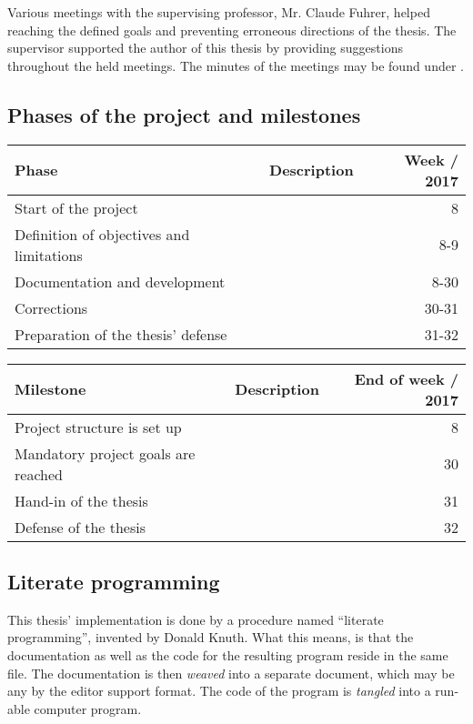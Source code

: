 \documentclass[10pt, openright, notitlepage]{scrreprt}
\begin{document}
Various meetings with the supervising professor, Mr. Claude Fuhrer, helped
reaching the defined goals and preventing erroneous directions of the thesis.
The supervisor supported the author of this thesis by providing suggestions
throughout the held meetings. The minutes of the meetings may be found under
\label{org5ea72a4}.

\subsection{Phases of the project and milestones}
\label{sec:org83e5910}


\begin{center}
\begin{tabular}{llr}
Phase & Description & Week / 2017\\
\hline
Start of the project &  & 8\\
Definition of objectives and limitations &  & 8-9\\
Documentation and development &  & 8-30\\
Corrections &  & 30-31\\
Preparation of the thesis' defense &  & 31-32\\
\end{tabular}
\end{center}

\begin{center}
\begin{tabular}{llr}
Milestone & Description & End of week / 2017\\
\hline
Project structure is set up &  & 8\\
Mandatory project goals are reached &  & 30\\
Hand-in of the thesis &  & 31\\
Defense of the thesis &  & 32\\
\end{tabular}
\end{center}

\subsection{Literate programming}
\label{sec:orgd0b865b}

This thesis' implementation is done by a procedure named ``literate
programming'', invented by Donald Knuth. What this means, is that the
documentation as well as the code for the resulting program reside in the same
file. The documentation is then \emph{weaved} into a separate document, which may be
any by the editor support format. The code of the program is \emph{tangled} into a
run-able computer program.
\end{document}
